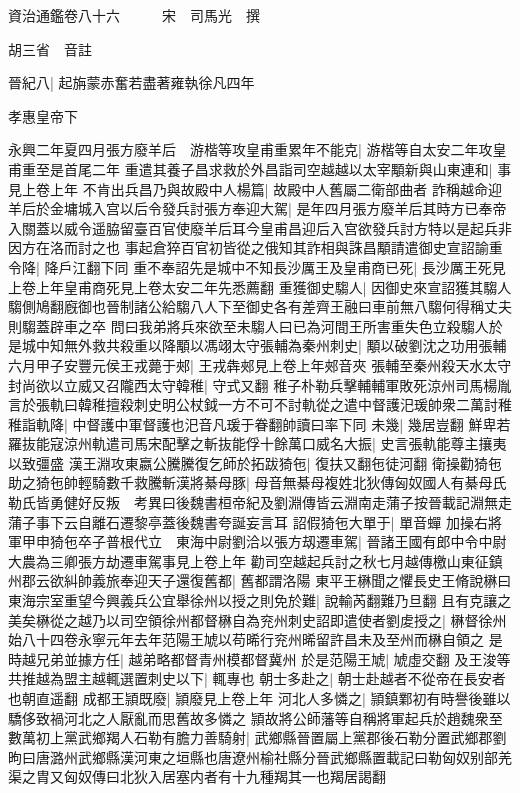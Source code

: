 資治通鑑卷八十六　　　宋　司馬光　撰

胡三省　音註

晉紀八|{
	起旃蒙赤奮若盡著雍執徐凡四年}


孝惠皇帝下

永興二年夏四月張方廢羊后　游楷等攻皇甫重累年不能克|{
	游楷等自太安二年攻皇甫重至是首尾二年}
重遣其養子昌求救於外昌詣司空越越以太宰顒新與山東連和|{
	事見上卷上年}
不肯出兵昌乃與故殿中人楊篇|{
	故殿中人舊屬二衛部曲者}
詐稱越命迎羊后於金墉城入宫以后令發兵討張方奉迎大駕|{
	是年四月張方廢羊后其時方已奉帝入關蓋以威令遥脇留臺百官使廢羊后耳今皇甫昌迎后入宫欲發兵討方特以是起兵非因方在洛而討之也}
事起倉猝百官初皆從之俄知其詐相與誅昌顒請遣御史宣詔諭重令降|{
	降戶江翻下同}
重不奉詔先是城中不知長沙厲王及皇甫商已死|{
	長沙厲王死見上卷上年皇甫商死見上卷太安二年先悉薦翻}
重獲御史騶人|{
	因御史來宣詔獲其騶人騶側鳩翻廐御也晉制諸公給騶八人下至御史各有差齊王融曰車前無八騶何得稱丈夫則騶蓋辟車之卒}
問曰我弟將兵來欲至未騶人曰已為河間王所害重失色立殺騶人於是城中知無外救共殺重以降顒以馮翊太守張輔為秦州刺史|{
	顒以破劉沈之功用張輔}
六月甲子安豐元侯王戎薨于郟|{
	王戎犇郟見上卷上年郟音夾}
張輔至秦州殺天水太守封尚欲以立威又召隴西太守韓稚|{
	守式又翻}
稚子朴勒兵擊輔輔軍敗死涼州司馬楊胤言於張軌曰韓稚擅殺刺史明公杖鉞一方不可不討軌從之遣中督護汜瑗帥衆二萬討稚稚詣軌降|{
	中督護中軍督護也汜音凡瑗于眷翻帥讀曰率下同}
未幾|{
	幾居豈翻}
鮮卑若羅抜能寇涼州軌遣司馬宋配擊之斬抜能俘十餘萬口威名大振|{
	史言張軌能尊主攘夷以致彊盛}
漢王淵攻東嬴公騰騰復乞師於拓跋猗㐌|{
	復扶又翻㐌徒河翻}
衛操勸猗㐌助之猗㐌帥輕騎數千救騰斬漢將綦母豚|{
	母音無綦母複姓北狄傳匈奴國人有綦母氏勒氏皆勇健好反叛　考異曰後魏書桓帝紀及劉淵傳皆云淵南走蒲子按晉載記淵無走蒲子事下云自離石遷黎亭蓋後魏書夸誕妄言耳}
詔假猗㐌大單于|{
	單音蟬}
加操右將軍甲申猗㐌卒子普根代立　東海中尉劉洽以張方刼遷車駕|{
	晉諸王國有郎中令中尉大農為三卿張方劫遷車駕事見上卷上年}
勸司空越起兵討之秋七月越傳檄山東征鎮州郡云欲糾帥義旅奉迎天子還復舊都|{
	舊都謂洛陽}
東平王楙聞之懼長史王脩說楙曰東海宗室重望今興義兵公宜舉徐州以授之則免於難|{
	說輸芮翻難乃旦翻}
且有克讓之美矣楙從之越乃以司空領徐州都督楙自為兖州刺史詔即遣使者劉䖍授之|{
	楙督徐州始八十四卷永寧元年去年范陽王虓以苟晞行兖州晞留許昌未及至州而楙自領之}
是時越兄弟並據方任|{
	越弟略都督青州模都督冀州}
於是范陽王虓|{
	虓虛交翻}
及王浚等共推越為盟主越輒選置刺史以下|{
	輒專也}
朝士多赴之|{
	朝士赴越者不從帝在長安者也朝直遥翻}
成都王頴既廢|{
	頴廢見上卷上年}
河北人多憐之|{
	頴鎮鄴初有時譽後雖以驕侈致禍河北之人厭亂而思舊故多憐之}
頴故將公師藩等自稱將軍起兵於趙魏衆至數萬初上黨武鄉羯人石勒有膽力善騎射|{
	武鄉縣晉置屬上黨郡後石勒分置武鄉郡劉昫曰唐潞州武鄉縣漢河東之垣縣也唐遼州榆社縣分晉武鄉縣置載記曰勒匈奴别部羌渠之胄又匈奴傳曰北狄入居塞内者有十九種羯其一也羯居謁翻}
